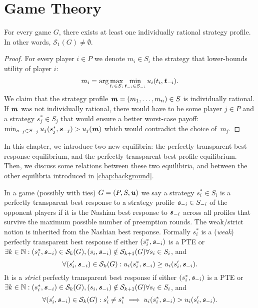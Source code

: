 \chapter{Game Theory}
\label{chap:game-theory}

\begin{lemma}
	For every game $G$, there exists at least one individually rational strategy profile.
	In other words, $\mathcal{S}_1(G) \ne \emptyset$.
\end{lemma}

\begin{proof}
	For every player $i \in P$ we denote $m_i \in S_i$ the strategy that lower-bounds utility of player $i$:
	\[
		m_i = \text{arg} \max_{t_i \in S_i} \min_{\boldsymbol{\mathit{t}}_{-i} \in S_{-i}} u_i(t_i, \boldsymbol{\mathit{t}}_{-i}).
	\]
	We claim that the strategy profile $\boldsymbol{\mathit{m}} = (m_1, \dots, m_n) \in S$ is individually rational.
	If $\boldsymbol{\mathit{m}}$ was not individually rational, there would have to be some player $j \in P$ and a strategy $s_j^* \in S_j$ that would ensure a better worst-case payoff: $\min_{\boldsymbol{\mathit{s}}_{-j} \in S_{-j}}u_j(s_j^*, \boldsymbol{\mathit{s}}_{-j}) > u_j(\boldsymbol{\mathit{m}})$ which would contradict the choice of~$m_j$.
\end{proof}

In this chapter, we introduce two new equilibria: the perfectly transparent best response equilibrium, and the perfectly transparent best profile equilibrium.
Then, we discuss some relations between these two equilibiria, and between the other equilibria introduced in \autoref{chap:background}.

\begin{definition}
	In a game (possibly with ties) $G = (P, S, \boldsymbol{\mathit{u}})$ we say a strategy $s_i^* \in S_i$ is a perfectly transparent best response to a strategy profile $\boldsymbol{\mathit{s}}_{-i} \in S_{-i}$ of the opponent players if it is the Nashian best response to $\boldsymbol{\mathit{s}}_{-i}$ across all profiles that survive the maximum possible number of preemption rounds.
	The weak/strict notion is inherited from the Nashian best response.
	Formally $s_i^*$ is a (\textit{weak}) perfectly transparent best response if either $(s_i^*, \boldsymbol{\mathit{s}}_{-i})$ is a PTE or $\exists k \in \mathbb{N}: (s_i^*, \boldsymbol{\mathit{s}}_{-i}) \in \mathcal{S}_k(G), (s_i, \boldsymbol{\mathit{s}}_{-i}) \notin \mathcal{S}_{k+1}(G) \forall s_i \in S_i$, and
	\[
		\forall (s_i', \boldsymbol{\mathit{s}}_{-i}) \in \mathcal{S}_k(G): u_i(s_i^*, \boldsymbol{\mathit{s}}_{-i}) \ge u_i(s_i', \boldsymbol{\mathit{s}}_{-i}).
	\]
	It is a \textit{strict} perfectly transparent best response if either $(s_i^*, \boldsymbol{\mathit{s}}_{-i})$ is a PTE or $\exists k \in \mathbb{N}: (s_i^*, \boldsymbol{\mathit{s}}_{-i}) \in \mathcal{S}_k(G), (s_i, \boldsymbol{\mathit{s}}_{-i}) \notin \mathcal{S}_{k+1}(G) \forall s_i \in S_i$, and
	\[
		\forall (s_i', \boldsymbol{\mathit{s}}_{-i}) \in \mathcal{S}_k(G): s_i' \ne s_i^* \implies u_i(s_i^*, \boldsymbol{\mathit{s}}_{-i}) > u_i(s_i', \boldsymbol{\mathit{s}}_{-i}).
	\]
\end{definition}

